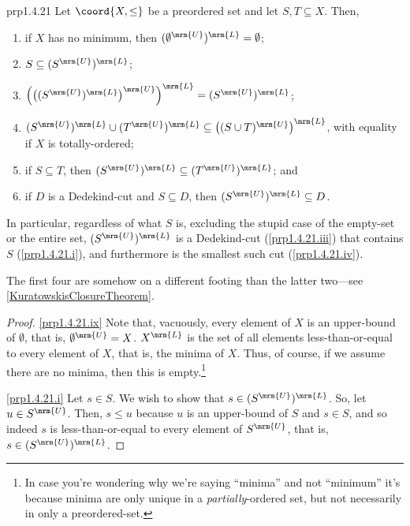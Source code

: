 \begin{prp}{}{prp1.4.21}
Let $\coord{X,\leq}$ be a preordered set and let $S,T\subseteq X$.  Then,
\begin{enumerate}
\item \label{prp1.4.21.ix}if $X$ has no minimum, then $(\emptyset ^{\mrm{U}})^{\mrm{L}}=\emptyset$;
\item \label{prp1.4.21.i}$S\subseteq (S^{\mrm{U}})^{\mrm{L}}$;
\item \label{prp1.4.21.iii}$\left( \left( (S^{\mrm{U}})^{\mrm{L}}\right) ^{\mrm{U}}\right) ^{\mrm{L}}=(S^{\mrm{U}})^{\mrm{L}}$;
\item \label{prp1.4.21.ivx}$(S^{\mrm{U}})^{\mrm{L}}\cup (T^{\mrm{U}})^{\mrm{L}}\subseteq \left( (S\cup T)^{\mrm{U}}\right) ^{\mrm{L}}$, with equality if $X$ is totally-ordered;
\item \label{prp1.4.21.ii}if $S\subseteq T$, then $(S^{\mrm{U}})^{\mrm{L}}\subseteq (T^{\mrm{U}})^{\mrm{L}}$; and
\item \label{prp1.4.21.iv}if $D$ is a Dedekind-cut and $S\subseteq D$, then $(S^{\mrm{U}})^{\mrm{L}}\subseteq D$.
\end{enumerate}
\begin{rmk}
In particular, regardless of what $S$ is, excluding the stupid case of the empty-set or the entire set, $(S^{\mrm{U}})^{\mrm{L}}$ is a Dedekind-cut (\cref{prp1.4.21.iii}) that contains $S$ (\cref{prp1.4.21.i}), and furthermore is the smallest such cut (\cref{prp1.4.21.iv}).
\end{rmk}
\begin{rmk}
The first four are somehow on a different footing than the latter two---see \cref{KuratowskisClosureTheorem}.
\end{rmk}
\begin{proof}
\cref{prp1.4.21.ix} Note that, vacuously, every element of $X$ is an upper-bound of $\emptyset$, that is, $\emptyset ^{\mrm{U}}=X$.  $X^{\mrm{L}}$ is the set of all elements less-than-or-equal to every element of $X$, that is, the minima of $X$.  Thus, of course, if we assume there are no minima, then this is empty.\footnote{In case you're wondering why we're saying ``minima'' and not ``minimum'' it's because minima are only unique in a \emph{partially}-ordered set, but not necessarily in only a preordered-set.}

\blankline
\noindent
\cref{prp1.4.21.i} Let $s\in S$.  We wish to show that $s\in (S^{\mrm{U}})^{\mrm{L}}$.  So, let $u\in S^{\mrm{U}}$.  Then, $s\leq u$ because $u$ is an upper-bound of $S$ and $s\in S$, and so indeed $s$ is less-than-or-equal to every element of $S^{\mrm{U}}$, that is, $s\in (S^{\mrm{U}})^{\mrm{L}}$.


\end{proof}
\end{prp}

